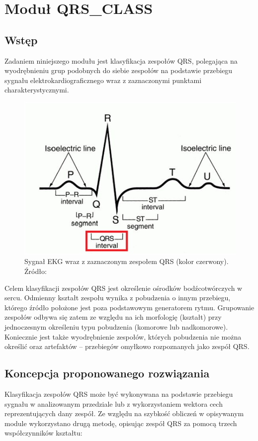 \section{Moduł QRS\_CLASS}

\subsection{Wstęp}
Zadaniem niniejszego modułu jest klasyfikacja zespołów QRS, polegająca na wyodrębnieniu grup podobnych do siebie zespołów na podstawie przebiegu sygnału elektrokardiograficznego wraz z zaznaczonymi punktami charakterystycznymi.\newline
\begin{figure}[h]
\centering
\includegraphics {QRS_CLASS/img/qrs_segment.png}
\caption{Sygnał EKG wraz z zaznaczonym zespołem QRS (kolor czerwony). Źródło: \cite{QRS_MedicalDictionary}}
\label{fig:QRS_Segment}
\end{figure}
\newline Celem klasyfikacji zespołów QRS jest określenie ośrodków bodźcotwórczych w sercu. Odmienny kształt zespołu wynika z pobudzenia o innym przebiegu, którego źródło położone jest poza podstawowym generatorem rytmu. Grupowanie zespołów odbywa się zatem ze względu na ich morfologię (kształt) przy jednoczesnym określeniu typu pobudzenia (komorowe lub nadkomorowe). Koniecznie jest także wyodrębnienie zespołów, których pobudzenia nie można określić oraz artefaktów – przebiegów omyłkowo rozpoznanych jako zespół QRS.

\subsection{Koncepcja proponowanego rozwiązania}
Klasyfikacja zespołów QRS może być wykonywana na podstawie przebiegu sygnału w analizowanym przedziale lub z wykorzystaniem wektora cech reprezentujących dany zespół. Ze względu na szybkość obliczeń w opisywanym module wykorzystano drugą metodę, opisując zespół QRS za pomocą trzech współczynników kształtu:

